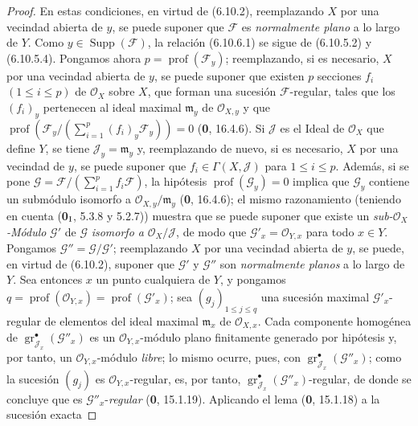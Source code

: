 \begin{proof}
En estas condiciones, en virtud de (6.10.2), reemplazando $X$ por una
vecindad abierta de $y$, se puede suponer que $\mathcal F$ es \emph{normalmente plano} a lo
largo de $Y$. Como $y\in\operatorname{Supp}(\mathcal F)$, la relación
(6.10.6.1) se sigue de (6.10.5.2) y (6.10.5.4). Pongamos ahora
$p=\operatorname{prof}(\mathcal F_y)$; reemplazando, si es necesario, $X$ por una
vecindad abierta de $y$, se puede suponer que existen $p$ secciones $f_i$
$(1\leq i\leq p)$ de $\mathcal O_X$ sobre $X$, que forman una sucesión
$\mathcal F$-regular, tales que los $(f_i)_y$ pertenecen al ideal
maximal $\mathfrak m_y$ de $\mathcal O_{X,y}$ y que
$\operatorname{prof}(\mathcal F_y/(\sum_{i=1}^{p}(f_i)_y\mathcal F_y))=0$
(\textbf 0, 16.4.6). Si $\mathcal J$ es el Ideal de $\mathcal O_X$ que define
$Y$, se tiene $\mathcal J_y=\mathfrak m_y$ y, reemplazando de nuevo, si es necesario, $X$
por una vecindad de $y$, se puede suponer que
$f_i\in\Gamma(X,\mathcal J)$ para $1\leq i\leq p$. Además, si se pone
$\mathcal G=\mathcal F/(\sum_{i=1}^{p}f_i\mathcal F)$, la hipótesis
$\operatorname{prof}(\mathcal G_y)=0$ implica que $\mathcal G_y$ contiene
un submódulo isomorfo a
$\mathcal O_{X,y}/\mathfrak m_y$ (\textbf 0, 16.4.6); el mismo razonamiento (teniendo
en cuenta (\textbf{0}$_{\rm I}$, 5.3.8 y 5.2.7)) muestra que se puede suponer que
existe un \emph{sub-$\mathcal O_X$-Módulo} $\mathcal G'$ de $\mathcal G$
\emph{isomorfo a} $\mathcal O_X/\mathcal J$, de modo que
$\mathcal G'_x=\mathcal O_{Y,x}$ para todo $x\in Y$. Pongamos
$\mathcal G''=\mathcal G/\mathcal G'$; reemplazando $X$ por una vecindad
abierta de $y$, se puede, en virtud de (6.10.2), suponer que $\mathcal G'$ y
$\mathcal G''$ son \emph{normalmente planos} a lo largo de $Y$. Sea entonces $x$ un
punto cualquiera de $Y$, y pongamos
$q=\operatorname{prof}(\mathcal O_{Y,x})=\operatorname{prof}(\mathcal G'_x)$;
sea $(g_j)_{1\leq j\leq q}$ una sucesión maximal
$\mathcal G'_x$-regular de elementos del ideal maximal
$\mathfrak m_x$ de $\mathcal O_{X,x}$. Cada componente homogénea de
$\operatorname{gr}_{\mathcal J_x}^{\bullet}(\mathcal G''_x)$ es un
$\mathcal O_{Y,x}$-módulo plano finitamente generado por hipótesis y, por tanto, un
$\mathcal O_{Y,x}$-módulo \emph{libre}; lo mismo ocurre, pues, con
$\operatorname{gr}_{\mathcal J_x}^{\bullet}(\mathcal G''_x)$; como la
sucesión $(g_j)$ es $\mathcal O_{Y,x}$-regular, es, por tanto,
$\operatorname{gr}_{\mathcal J_x}^{\bullet}(\mathcal G''_x)$-regular,
de donde se concluye que es $\mathcal G''_x$-\emph{regular} (\textbf 0, 15.1.19).
Aplicando el lema (\textbf 0, 15.1.18) a la sucesión exacta

\end{proof}
